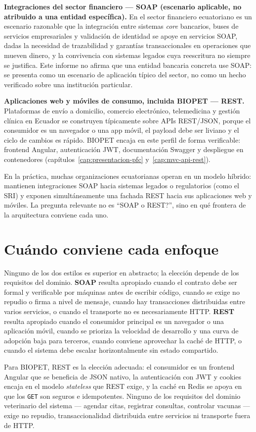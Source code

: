 \textbf{Integraciones del sector financiero --- SOAP (escenario aplicable,
no atribuido a una entidad espec\'ifica).} En el sector financiero
ecuatoriano es un escenario razonable que la integraci\'on entre sistemas
\emph{core} bancarios, buses de servicios empresariales y validaci\'on de
identidad se apoye en servicios SOAP, dadas la necesidad de trazabilidad y
garant\'ias transaccionales en operaciones que mueven dinero, y la
convivencia con sistemas legados cuya reescritura no siempre se justifica.
Este informe no afirma que una entidad bancaria concreta use SOAP: se
presenta como un escenario de aplicaci\'on t\'ipico del sector, no como un
hecho verificado sobre una instituci\'on particular.

\textbf{Aplicaciones web y m\'oviles de consumo, incluida BIOPET ---
REST.} Plataformas de env\'io a domicilio, comercio electr\'onico,
telemedicina y gesti\'on cl\'inica en Ecuador se construyen t\'ipicamente
sobre APIs REST/JSON, porque el consumidor es un navegador o una app
m\'ovil, el payload debe ser liviano y el ciclo de cambios es r\'apido.
BIOPET encaja en este perfil de forma verificable: frontend Angular,
autenticaci\'on JWT, documentaci\'on Swagger y despliegue en contenedores
(cap\'itulos~\ref{cap:presentacion-pfc} y~\ref{cap:mvc-api-rest}).

En la pr\'actica, muchas organizaciones ecuatorianas operan en un modelo
h\'ibrido: mantienen integraciones SOAP hacia sistemas legados o
regulatorios (como el SRI) y exponen simult\'aneamente una fachada REST
hacia sus aplicaciones web y m\'oviles. La pregunta relevante no es
``\textquestiondown SOAP o REST?'', sino en qu\'e frontera de la
arquitectura conviene cada uno.

\section{Cu\'ando conviene cada enfoque}
\label{sec:soap-rest-cuando}

Ninguno de los dos estilos es superior en abstracto; la elecci\'on depende
de los requisitos del dominio. \textbf{SOAP} resulta apropiado cuando el
contrato debe ser formal y verificable por m\'aquinas antes de escribir
c\'odigo, cuando se exige no repudio o firma a nivel de mensaje, cuando hay
transacciones distribuidas entre varios servicios, o cuando el transporte
no es necesariamente HTTP. \textbf{REST} resulta apropiado cuando el
consumidor principal es un navegador o una aplicaci\'on m\'ovil, cuando se
prioriza la velocidad de desarrollo y una curva de adopci\'on baja para
terceros, cuando conviene aprovechar la cach\'e de HTTP, o cuando el sistema
debe escalar horizontalmente sin estado compartido.

Para BIOPET, REST es la elecci\'on adecuada: el consumidor es un frontend
Angular que se beneficia de JSON nativo, la autenticaci\'on con JWT y
cookies encaja en el modelo \emph{stateless} que REST exige, y la cach\'e en
Redis se apoya en que los \texttt{GET} son seguros e idempotentes. Ninguno
de los requisitos del dominio veterinario del sistema --- agendar citas,
registrar consultas, controlar vacunas --- exige no repudio, transaccionalidad
distribuida entre servicios ni transporte fuera de HTTP.
